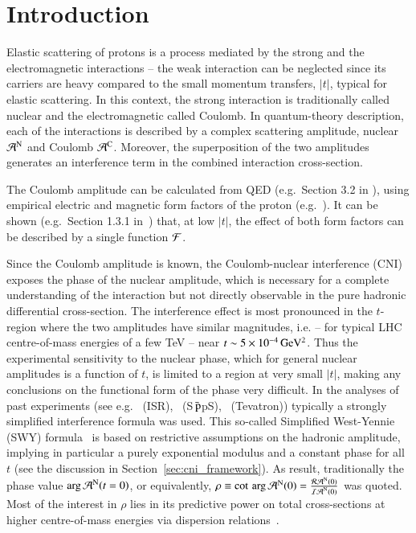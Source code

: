\section{Introduction}
%
Elastic scattering of protons is a process mediated by the strong and the electromagnetic interactions -- the weak interaction can be neglected since its carriers are heavy compared to the small momentum transfers, $|t|$, typical for elastic scattering. In this context, the strong interaction is traditionally called nuclear and the electromagnetic called Coulomb. In quantum-theory description, each of the interactions is described by a complex scattering amplitude, nuclear ${\cal A}^{\rm N}$ and Coulomb ${\cal A}^{\rm C}$. Moreover, the superposition 
of the two amplitudes generates an interference term in the combined interaction cross-section. 

The Coulomb amplitude can be calculated from QED (e.g.~Section 3.2 in \cite{block06}), using empirical electric and magnetic form factors of the proton (e.g.~\cite{puckett10}). It can be shown (e.g.~Section 1.3.1 in~\cite{jan_thesis}) that, at low $|t|$, the effect of both form factors can be described by a single function ${\cal F}$. 

Since the Coulomb amplitude is known, the Coulomb-nuclear interference (CNI) exposes the phase of the nuclear amplitude, which is necessary for a complete understanding of the interaction but not directly observable in the pure hadronic differential cross-section. The interference effect is most pronounced in the $t$-region where the two amplitudes have similar magnitudes, i.e. -- for typical LHC centre-of-mass energies of a few TeV -- near $t \sim 5 \times 10^{-4}\,\rm GeV^{2}$. Thus the experimental sensitivity to 
the nuclear phase, which for general nuclear amplitudes is a function of $t$, 
is limited to a region at very small $|t|$, making any conclusions on the 
functional form of the phase very difficult.
In the analyses of past experiments (see e.g.~\cite{plb43,plb66,npb141,prl47,plb115,plb120,plb128,npb262} 
(ISR),~\cite{plb198,plb316} (S$\bar{\,{\rm p}}$pS),~\cite{prl68} (Tevatron)) 
typically a strongly simplified interference formula was used. This so-called
Simplified West-Yennie (SWY) formula~\cite{wy68} is based on restrictive assumptions on the 
hadronic amplitude, implying in particular a purely exponential modulus and a 
constant phase for all $t$ (see the discussion in 
Section~\ref{sec:cni_framework}).
As result, traditionally the phase value $\arg {\cal A}^{\rm N} (t=0)$, or
equivalently, $\rho \equiv \cot \, \arg {\cal A}^{\rm N} (0) = \frac{{\cal R A}^{\rm N} (0)}{{\cal I A}^{\rm N} (0)}$ was quoted. 
Most of the interest in $\rho$ lies in its predictive power on total cross-sections at higher centre-of-mass energies via dispersion 
relations~\cite{dremin-dispersion}. 

